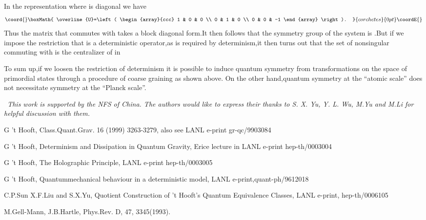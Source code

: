 \documentclass[a4paper,12pt]{article}
\begin{document}
In the representation where \coordHE{} is diagonal we have
\[\coord{}\boxMath{
\overline{U}=\left(
\begin{array}{ccc}
1 & 0 & 0 \\
0 & 1 & 0 \\
0 & 0 & -1
\end{array}
\right).
}{corchetes}{0pt}\coordE{}\]
Thus the matrix \coordHE{} that commutes with \coordHE{} takes a block diagonal
form.It then follows that the symmetry group of the system is \coordHE{}.But if we impose the restriction that \coordHE{} is a deterministic
operator,as is required by determinism,it then turns out that the set of
nonsingular \coordHE{} commuting with \coordHE{} is \coordHE{}the centralizer of \coordHE{} in \coordHE{}

To sum up,if we loosen the restriction of determinism it is possible to
induce quantum symmetry from transformations on the space of primordial
states through a procedure of coarse graining as shown above. On the other
hand,quantum symmetry at the ``atomic scale'' does not necessitate symmetry
at the ``Planck scale''.

\medskip

\noindent \textit{\ This work is supported by the NFS of China. The authors
would like to express their thanks to S. X. Yu, Y. L. Wu, M.Yu and M.Li for
helpful discussion with them.}

\begin{thebibliography}{9}
  G 't Hooft, Class.Quant.Grav. 16 (1999) 3263-3279, also see
LANL e-print gr-qc/9903084

  G 't Hooft, Determinism and Dissipation in Quantum Gravity,
Erice lecture in LANL e-print hep-th/0003004

  G 't Hooft, The Holographic Principle, LANL e-print
hep-th/0003005

  G 't Hooft, Quantummechanical behaviour in a deterministic
model, LANL e-print,quant-ph/9612018

  C.P.Sun X.F.Liu and S.X.Yu, Quotient Construction of 't Hooft's
Quantum Equivalence Classes, LANL e-print, hep-th/0006105

  M.Gell-Mann, J.B.Hartle, Phys.Rev. D, 47, 3345(1993).
\end{thebibliography}
\end{document}
